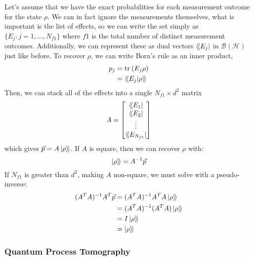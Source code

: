 Let's assume that we have the exact probabilities for each measurement outcome for the state $\rho$.
We can in fact ignore the measurements themselves, what is important is the list of effects, so we
can write the set simply as $\{ E_j : j = 1, \dots, N_{f1}\}$ where $f1$ is the total number of
distinct measurement outcomes. Additionally, we can represent these as dual vectors $\langle\!\bra{E_j}$
in $\mathcal{B(H)}$ just like before. To recover $\rho$, we can write Born's rule as an inner
product, 
\begin{equation}
    \begin{aligned}
        p_j &= \text{tr}_{}\left(E_j \rho\right) \\
            &= \langle\!\braket{E_j | \rho}\!\rangle
    \end{aligned}
\end{equation}
Then, we can stack all of the effects into a single $N_{f1} \times d^2$ matrix
\begin{equation}
    A = \begin{bmatrix}
        \langle\!\bra{E_1} \\
        \langle\!\bra{E_2} \\
        \vdots \\
        \langle\!\bra{E_{N_{f1}}}
    \end{bmatrix}
\end{equation}
which gives $\vec{p} = A \ket{\rho}\!\rangle$. If $A$ is square, then we can recover $\rho$ with:
\begin{equation}
    \ket{\rho}\!\rangle = A^{-1} \vec{p}
\end{equation}
If $N_{f1}$ is greater than $d^2$, making $A$ non-square, we must solve with a pseudo-inverse:
\begin{equation}
    \begin{aligned}
        (A^T A)^{-1} A^T \vec{p} &= (A^T A)^{-1} A^T A \ket{\rho}\!\rangle \\
                                 &= (A^T A)^{-1} (A^T A) \ket{\rho}\!\rangle \\
                                 &= I \ket{\rho}\!\rangle \\
                                 &= \ket{\rho}\!\rangle
    \end{aligned}
\end{equation}

\subsubsection{Quantum Process Tomography}

